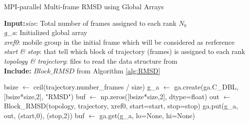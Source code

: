 \begin{algorithm}[ht!]
	\scriptsize
	\caption{MPI-parallel Multi-frame RMSD using Global Arrays}
	\label{alg:GA}
	\hspace*{\algorithmicindent} \textbf{Input:}\emph{size}: Total number of frames assigned to each rank $N_{b}$\\
	\hspace*{\algorithmicindent} \emph{g\_a}: Initialized global array \\
	\hspace*{\algorithmicindent} \emph{xref0}: mobile group in the initial frame which will be considered as rerference \\
	\hspace*{\algorithmicindent} \emph{start \& stop}: that tell which block of trajectory (frames) is assigned to each rank \\
	\hspace*{\algorithmicindent} \emph{topology \& trajectory}: files to read the data structure from \\
	\hspace*{\algorithmicindent}\textbf{Include:} $Block\_RMSD$ from Algorithm \ref{alg:RMSD}
	\begin{algorithmic}[1]
		
		\State bsize $\leftarrow$ ceil(trajectory.number\_frames / size)
		\State g\_a $\leftarrow$ ga.create(ga.C\_DBL, [bsize*size,2], "RMSD")
		\State buf $\leftarrow$ np.zeros([bsize*size,2], dtype=float)
		\State out $\leftarrow$ Block\_RMSD(topology, trajectory, xref0, start=start, stop=stop)
		\State ga.put(g\_a, out, (start,0), (stop,2))
		\State buf $\leftarrow$ ga.get(g\_a, lo=None, hi=None)
		\EndIf
	\end{algorithmic}
\end{algorithm}

